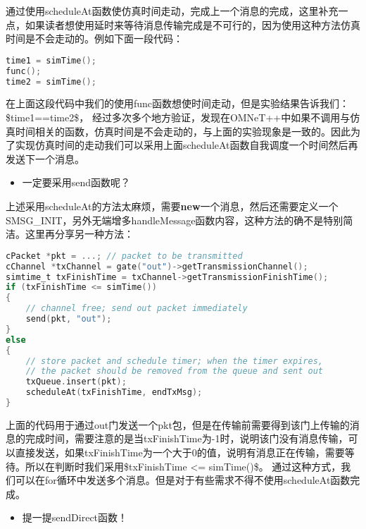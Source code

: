 通过使用scheduleAt函数使仿真时间走动，完成上一个消息的完成，这里补充一点，如果读者想使用延时来等待消息传输完成是不可行的，因为使用这种方法仿真时间是不会走动的。例如下面一段代码：

\begin{lstlisting}[language=c]
time1 = simTime();
func();
time2 = simTime();
\end{lstlisting}

在上面这段代码中我们的使用func函数想使时间走动，但是实验结果告诉我们：
\$time1==time2\$，
经过多次多个地方验证，发现在OMNeT++中如果不调用与仿真时间相关的函数，仿真时间是不会走动的，与上面的实验现象是一致的。因此为了实现仿真时间的走动我们可以采用上面scheduleAt函数自我调度一个时间然后再发送下一个消息。

\begin{itemize}
\item 一定要采用send函数呢？

\end{itemize}

上述采用scheduleAt的方法太麻烦，需要\textbf{new}一个消息，然后还需要定义一个SMSG\_INIT，另外无端增多handleMessage函数内容，这种方法的确不是特别简洁。这里再分享另一种方法：

\begin{lstlisting}[language=c]
cPacket *pkt = ...; // packet to be transmitted
cChannel *txChannel = gate("out")->getTransmissionChannel();
simtime_t txFinishTime = txChannel->getTransmissionFinishTime();
if (txFinishTime <= simTime())
{
    // channel free; send out packet immediately
    send(pkt, "out");
}
else
{
    // store packet and schedule timer; when the timer expires,
    // the packet should be removed from the queue and sent out
    txQueue.insert(pkt);
    scheduleAt(txFinishTime, endTxMsg);
}

\end{lstlisting}

上面的代码用于通过out门发送一个pkt包，但是在传输前需要得到该门上传输的消息的完成时间，需要注意的是当txFinishTime为-1时，说明该门没有消息传输，可以直接发送，如果txFinishTime为一个大于0的值，说明有消息正在传输，需要等待。所以在判断时我们采用\$txFinishTime <= simTime()\$。
通过这种方式，我们可以在for循环中发送多个消息。但是对于有些需求不得不使用scheduleAt函数完成。

\begin{itemize}
\item 提一提sendDirect函数！

\end{itemize}


